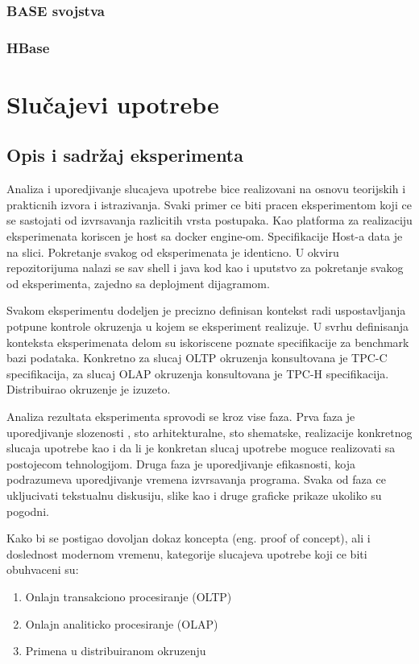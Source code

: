 \documentclass[12pt,oneside]{memoir}
\begin{document}
\subsection{BASE svojstva}
\subsection{HBase}


\chapter{Slučajevi upotrebe}
\section{Opis i sadržaj eksperimenta}
Analiza i uporedjivanje slucajeva upotrebe bice realizovani na osnovu teorijskih i prakticnih  izvora i istrazivanja. Svaki primer ce biti pracen eksperimentom koji ce se sastojati od izvrsavanja razlicitih vrsta postupaka. Kao platforma za realizaciju eksperimenata koriscen je host sa docker engine-om. Specifikacije Host-a data je na slici. Pokretanje svakog od eksperimenata je identicno. U okviru repozitorijuma nalazi se sav shell i java kod kao i uputstvo za pokretanje svakog od eksperimenta, zajedno sa deplojment dijagramom.

Svakom eksperimentu dodeljen je precizno definisan kontekst radi uspostavljanja potpune kontrole okruzenja u kojem se eksperiment realizuje. U svrhu definisanja konteksta eksperimenata delom su iskoriscene poznate specifikacije za benchmark bazi podataka. Konkretno za slucaj OLTP okruzenja konsultovana je TPC-C specifikacija, za slucaj OLAP okruzenja konsultovana je TPC-H specifikacija. Distribuirao okruzenje je izuzeto.

Analiza rezultata eksperimenta sprovodi se kroz vise faza. Prva faza je uporedjivanje slozenosti , sto arhitekturalne, sto shematske, realizacije konkretnog slucaja upotrebe kao i da li je konkretan slucaj upotrebe moguce realizovati sa postojecom tehnologijom. Druga faza je uporedjivanje efikasnosti, koja podrazumeva uporedjivanje vremena izvrsavanja programa.  Svaka od faza ce ukljucivati tekstualnu diskusiju, slike kao i druge graficke prikaze ukoliko su pogodni.

Kako bi se postigao dovoljan dokaz koncepta (eng. proof of concept), ali i doslednost modernom
vremenu, kategorije slucajeva upotrebe koji ce biti obuhvaceni su:
\begin{enumerate}
\item Onlajn transakciono procesiranje (OLTP)
\item Onlajn analiticko procesiranje (OLAP)
\item Primena u distribuiranom okruzenju
\end{enumerate}
\end{document}
